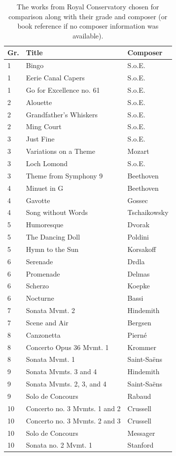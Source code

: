 \documentclass[10pt,preprint]{sigplanconf}
\begin{document}
\begin{table}[ht!]
	\centering
    \begin{tabular}{| l | l | l |}
        \hline
    Gr. & Title & Composer \\ \hline
    1 & Bingo & S.o.E. \\ \hline
	1 & Eerie Canal Capers & S.o.E. \\ \hline
	1 & Go for Excellence no. 61 & S.o.E. \\ \hline
	2 & Alouette & S.o.E. \\ \hline
	2 & Grandfather's Whiskers & S.o.E. \\ \hline
	2 & Ming Court & S.o.E. \\ \hline
	3 & Just Fine & S.o.E. \\ \hline
	3 & Variations on a Theme & Mozart \\ \hline
	3 & Loch Lomond & S.o.E. \\ \hline
	3 & Theme from Symphony 9 & Beethoven \\ \hline
	4 & Minuet in G & Beethoven \\ \hline
	4 & Gavotte & Gossec \\ \hline
	4 & Song without Words & Tschaikowsky \\ \hline
	5 & Humoresque & Dvorak \\ \hline
	5 & The Dancing Doll & Poldini \\ \hline
	5 & Hymn to the Sun & Korsakoff \\ \hline
	6 & Serenade & Drdla \\ \hline
	6 & Promenade & Delmas \\ \hline
	6 & Scherzo & Koepke \\ \hline
	6 & Nocturne & Bassi \\ \hline
	7 & Sonata Mvmt. 2 & Hindemith \\ \hline
	7 & Scene and Air & Bergsen \\ \hline
	8 & Canzonetta & Piern\'e \\ \hline
	8 & Concerto Opus 36 Mvmt. 1 & Krommer \\ \hline
	8 & Sonata Mvmt. 1 & Saint-Sa\"ens \\ \hline
	9 & Sonata Mvmts. 3 and 4 & Hindemith \\ \hline
	9 & Sonata Mvmts. 2, 3, and 4 & Saint-Sa\"ens \\ \hline
	9 & Solo de Concours & Rabaud \\ \hline
	10 & Concerto no. 3 Mvmts. 1 and 2 & Crussell \\ \hline
	10 & Concerto no. 3 Mvmts. 2 and 3 & Crussell \\ \hline
	10 & Solo de Concours & Messager \\ \hline
	10 & Sonata no. 2 Mvmt. 1 & Stanford \\
        \hline
    \end{tabular}
	\caption{The works from Royal Conservatory chosen for comparison along with their grade and composer (or book reference if no composer information was available).}
	\label{table:pieces}
\end{table} 
\end{document}
